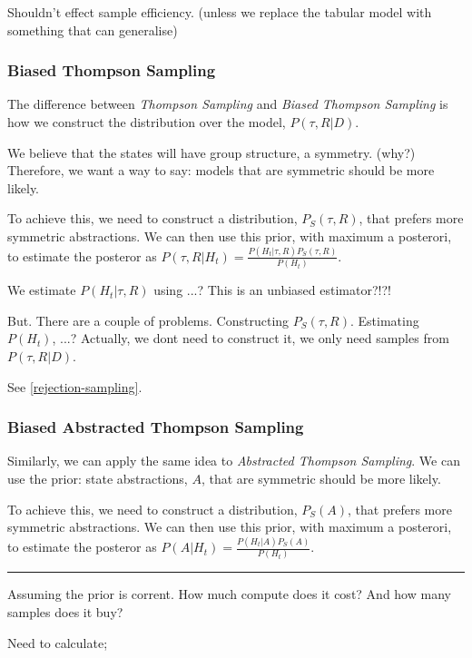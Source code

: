 Shouldn't effect sample efficiency. (unless we replace the tabular model with something that can generalise)

\subsubsection{Biased Thompson Sampling}

The difference between \textit{Thompson Sampling} and \textit{Biased Thompson Sampling}
is how we construct the distribution over the model, $P(\tau, R |D)$.

We believe that the states will have group structure, a symmetry. ({\color{red}why?})
Therefore, we want a way to say: models that are symmetric should be more likely.

To achieve this, we need to construct a distribution, $P_S(\tau, R)$, that prefers more symmetric abstractions.
We can then use this prior, with maximum a posterori, to estimate the posteror as $P(\tau, R | H_t) = \frac{P(H_t | \tau, R)P_S(\tau, R)}{P(H_t)}$.

We estimate $P(H_t | \tau, R)$ using ...? This is an unbiased estimator?!?!

But. There are a couple of problems. Constructing $P_S(\tau, R)$. Estimating $P(H_t)$, ...?
Actually, we dont need to construct it, we only need samples from $P(\tau, R | D)$.

See \ref{rejection-sampling}.

\subsubsection{Biased Abstracted Thompson Sampling}

Similarly, we can apply the same idea to \textit{Abstracted Thompson Sampling}.
We can use the prior: state abstractions, $A$, that are symmetric should be more likely.

To achieve this, we need to construct a distribution, $P_S(A)$, that prefers more symmetric abstractions.
We can then use this prior, with maximum a posterori, to estimate the posteror as $P(A | H_t) = \frac{P(H_t | A)P_S(A)}{P(H_t)}$.

\begin{center}\rule{0.5\linewidth}{\linethickness}\end{center}

Assuming the prior is corrent. How much compute does it cost? And how many samples does it buy?

Need to calculate;

